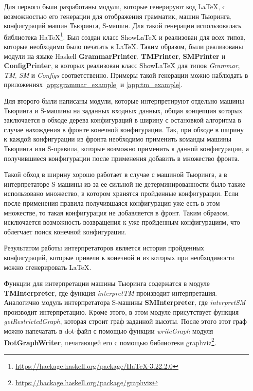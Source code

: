 \documentclass[14pt]{matmex-diploma-custom}
\begin{document}
Для первого были разработаны модули, которые генерируют код LaTeX, с возможностью его генерации для отображения грамматик, машин Тьюринга, конфигураций машин Тьюринга, S-машин. 
Для такой генерации использовалась библиотека HaTeX\footnote{\url{https://hackage.haskell.org/package/HaTeX-3.22.2.0}}. Был создан класс ShowLaTeX и реализован для всех типов, которые необходимо было печатать в LaTeX. 
Таким образом, были реализованы модули на языке Haskell \textbf{GrammarPrinter}, \textbf{TMPrinter}, \textbf{SMPrinter} и \textbf{ConfigPrinter}, в которых реализован класс ShowLaTeX для типов \textit{Grammar}, \textit{TM}, \textit{SM} и \textit{Configs} соответственно. Примеры такой генерации можно наблюдать в приложениях \ref{app:grammar_example} и \ref{app:tm_example}.

Для второго были написаны модули, которые интерпретируют отдельно машины Тьюринга и S-машины на заданных входных данных, общая концепция которых заключается в обходе дерева конфигураций в ширину с остановкой алгоритма в случае нахождения в фронте конечной конфигурации. Так, при обходе в ширину к каждой конфигурации из фронта необходимо применить команды машины Тьюринга или S-правила, которые возможно применить к данной конфигурации, а получившиеся конфигурации после применения добавить в множество фронта. 

Такой обход в ширину хорошо работает в случае с машиной Тьюринга, а в интерпретаторе S-машины из-за ее сильной не детерминированности было также использовано множество, в котором хранятся пройденные конфигурации. Если после применения правила получившаяся конфигурация уже есть в этом множестве, то такая конфигурация не добавляется в фронт. Таким образом, исключается возможность возвращения к уже пройденным конфигурациям, что облегчает поиск конечной конфигурации.  

Результатом работы интерпретаторов является история пройденных конфигураций, которые привели к конечной и из которых при необходимости можно сгенерировать LaTeX. 

Функции для интерпретации машины Тьюринга содержатся в модуле \textbf{TMInterpreter}, где функция \textit{interpretTM} производит интерпретация. Аналогично модуль интерпретатора S-машины \textbf{SMInterpreter}, где \textit{interpretSM} производит интерпретацию. 
Кроме этого, в этом модуле присутствует функция \textit{getRestrictedGraph}, которая строит граф заданной высоты. После этого этот граф можно напечатать в dot-файл с помощью функции \textit{writeGraph} модуля \textbf{DotGraphWriter}, печатающей его с помощью библиотеки graphviz\footnote{\url{https://hackage.haskell.org/package/graphviz}}. 
\end{document}
